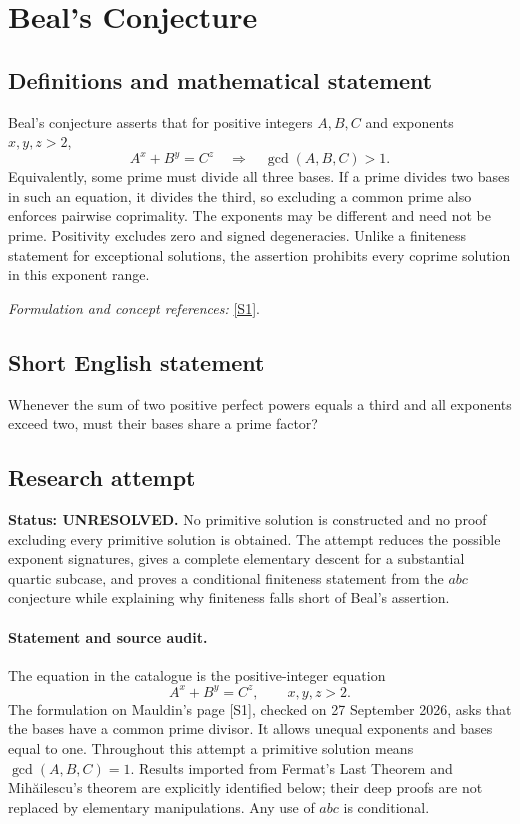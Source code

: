 \documentclass[11pt]{article}
\begin{document}
\section*{\texorpdfstring{Beal's Conjecture}{Beal's Conjecture}}\label{1286}
\subsection{Definitions and mathematical statement}
Beal's conjecture asserts that for positive integers $A,B,C$ and exponents $x,y,z>2$,
\[
 A^x+B^y=C^z\quad\Longrightarrow\quad\gcd(A,B,C)>1.
\]
Equivalently, some prime must divide all three bases. If a prime divides two bases in such an equation, it divides the third, so excluding a common prime also enforces pairwise coprimality. The exponents may be different and need not be prime. Positivity excludes zero and signed degeneracies. Unlike a finiteness statement for exceptional solutions, the assertion prohibits every coprime solution in this exponent range.
\par\smallskip\textit{Formulation and concept references:} \href{https://sites.math.unt.edu/~mauldin/beal.html}{[S1]}.

\subsection{Short English statement}
Whenever the sum of two positive perfect powers equals a third and all exponents exceed two, must their bases share a prime factor?
\subsection{Research attempt}
\textbf{Status: UNRESOLVED.} No primitive solution is constructed and no proof excluding every primitive solution is obtained. The attempt reduces the possible exponent signatures, gives a complete elementary descent for a substantial quartic subcase, and proves a conditional finiteness statement from the $abc$ conjecture while explaining why finiteness falls short of Beal's assertion.

\paragraph{Statement and source audit.}
The equation in the catalogue is the positive-integer equation
\[
 A^x+B^y=C^z,\qquad x,y,z>2.
\]
The formulation on Mauldin's page [S1], checked on 27 September 2026, asks that the bases have a common prime divisor. It allows unequal exponents and bases equal to one. Throughout this attempt a primitive solution means $\gcd(A,B,C)=1$. Results imported from Fermat's Last Theorem and Mih\u{a}ilescu's theorem are explicitly identified below; their deep proofs are not replaced by elementary manipulations. Any use of $abc$ is conditional.
\end{document}
